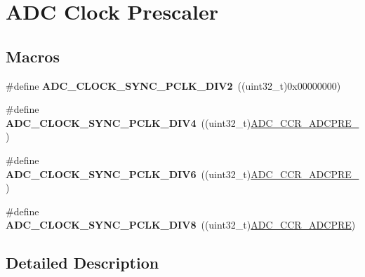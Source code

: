 \hypertarget{group___a_d_c___clock_prescaler}{}\section{A\+DC Clock Prescaler}
\label{group___a_d_c___clock_prescaler}
\subsection*{Macros}
\begin{DoxyCompactItemize}
\item 
\#define {\bfseries A\+D\+C\+\_\+\+C\+L\+O\+C\+K\+\_\+\+S\+Y\+N\+C\+\_\+\+P\+C\+L\+K\+\_\+\+D\+I\+V2}~((uint32\+\_\+t)0x00000000)\hypertarget{group___a_d_c___clock_prescaler_ga71571b183aa6d0ddbaeef8a1da11d00a}{}\label{group___a_d_c___clock_prescaler_ga71571b183aa6d0ddbaeef8a1da11d00a}

\item 
\#define {\bfseries A\+D\+C\+\_\+\+C\+L\+O\+C\+K\+\_\+\+S\+Y\+N\+C\+\_\+\+P\+C\+L\+K\+\_\+\+D\+I\+V4}~((uint32\+\_\+t)\hyperlink{group___peripheral___registers___bits___definition_gaf3108cc8fb81f6efd1e93fa5f82ac313}{A\+D\+C\+\_\+\+C\+C\+R\+\_\+\+A\+D\+C\+P\+R\+E\+\_})\hypertarget{group___a_d_c___clock_prescaler_ga41b6a6d1cdf7806ec1e5790fc7fdc651}{}\label{group___a_d_c___clock_prescaler_ga41b6a6d1cdf7806ec1e5790fc7fdc651}

\item 
\#define {\bfseries A\+D\+C\+\_\+\+C\+L\+O\+C\+K\+\_\+\+S\+Y\+N\+C\+\_\+\+P\+C\+L\+K\+\_\+\+D\+I\+V6}~((uint32\+\_\+t)\hyperlink{group___peripheral___registers___bits___definition_gafa090830d2d359db04f365d46c6644d5}{A\+D\+C\+\_\+\+C\+C\+R\+\_\+\+A\+D\+C\+P\+R\+E\+\_})\hypertarget{group___a_d_c___clock_prescaler_ga0da8cf05586963080a721928cae18913}{}\label{group___a_d_c___clock_prescaler_ga0da8cf05586963080a721928cae18913}

\item 
\#define {\bfseries A\+D\+C\+\_\+\+C\+L\+O\+C\+K\+\_\+\+S\+Y\+N\+C\+\_\+\+P\+C\+L\+K\+\_\+\+D\+I\+V8}~((uint32\+\_\+t)\hyperlink{group___peripheral___registers___bits___definition_ga3a2ee019aef4c64fffc72141f7aaab2c}{A\+D\+C\+\_\+\+C\+C\+R\+\_\+\+A\+D\+C\+P\+RE})\hypertarget{group___a_d_c___clock_prescaler_gadc0676c90087e9cd3acc3ee1256f3cd0}{}\label{group___a_d_c___clock_prescaler_gadc0676c90087e9cd3acc3ee1256f3cd0}

\end{DoxyCompactItemize}


\subsection{Detailed Description}
